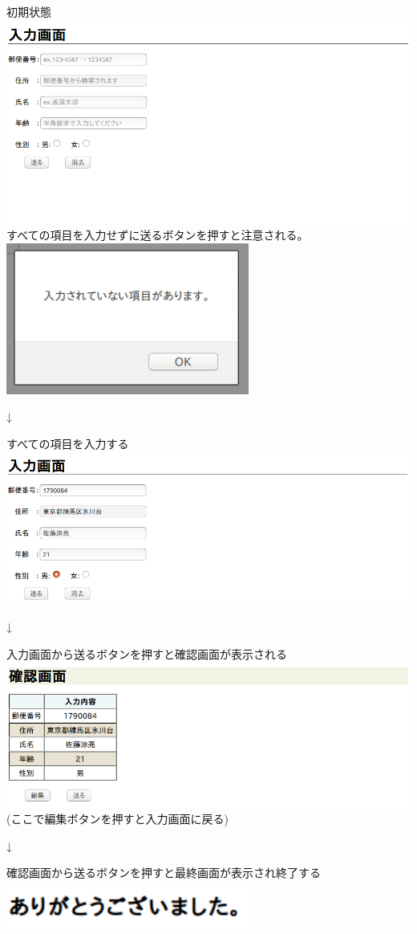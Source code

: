 \documentclass[a4j]{jarticle}
\begin{document}
\begin{center}
初期状態
\includegraphics[width=15cm]{result/result1.png}\\
すべての項目を入力せずに送るボタンを押すと注意される。\\
\includegraphics[width=8cm]{result/result2.png}

{\LARGE↓}

すべての項目を入力する
\includegraphics[width=15cm]{result/result3.png}

{\LARGE↓}

入力画面から送るボタンを押すと確認画面が表示される
\includegraphics[width=15cm]{result/result4.png}
(ここで編集ボタンを押すと入力画面に戻る)

{\LARGE↓}

確認画面から送るボタンを押すと最終画面が表示され終了する
\includegraphics[width=8cm]{result/result5.png}
\end{center}
\end{document}
